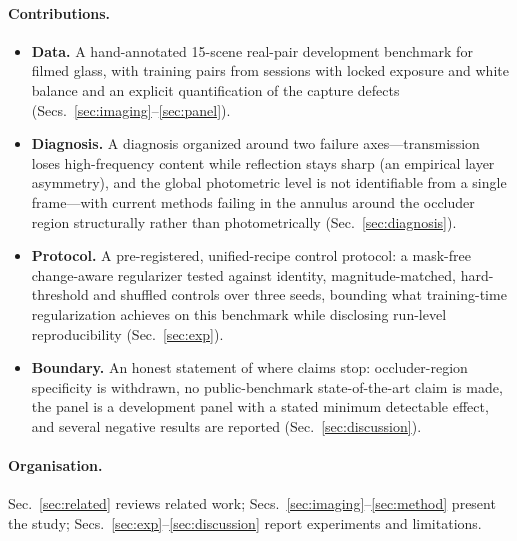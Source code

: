\paragraph{Contributions.}
\begin{itemize}
\item \textbf{Data.} A hand-annotated 15-scene real-pair development benchmark for filmed
glass, with training pairs from sessions with locked exposure and white balance and an
explicit quantification of the capture defects (Secs.~\ref{sec:imaging}--\ref{sec:panel}).
\item \textbf{Diagnosis.} A diagnosis organized around two failure axes---transmission
loses high-frequency content while reflection stays sharp (an empirical layer
asymmetry), and the global photometric level is not identifiable from a single
frame---with current methods failing in the annulus around the occluder region
structurally rather than photometrically (Sec.~\ref{sec:diagnosis}).
\item \textbf{Protocol.} A pre-registered, unified-recipe control protocol: a mask-free
change-aware regularizer tested against identity, magnitude-matched, hard-threshold and
shuffled controls over three seeds, bounding what training-time regularization achieves
on this benchmark while disclosing run-level reproducibility (Sec.~\ref{sec:exp}).
\item \textbf{Boundary.} An honest statement of where claims stop: occluder-region
specificity is withdrawn, no public-benchmark state-of-the-art claim is made, the panel
is a development panel with a stated minimum detectable effect, and several negative
results are reported (Sec.~\ref{sec:discussion}).
\end{itemize}

\paragraph{Organisation.} Sec.~\ref{sec:related} reviews related work;
Secs.~\ref{sec:imaging}--\ref{sec:method} present the study;
Secs.~\ref{sec:exp}--\ref{sec:discussion} report experiments and limitations.
